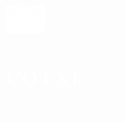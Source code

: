 \documentclass[../main.tex]{subfiles}
\begin{document}
\hspace*{0.2cm}
    \begin{minipage}[t]{2cm}
        \vspace*{0.9cm}\includegraphics[width=1.5cm]{assets/car.png}
    \end{minipage}
    \begin{minipage}[t]{5cm}
    
        \vspace*{0.75cm}
        \section*{\textcolor{white}{COTXE}}
        \vspace*{-0.25cm}
        \textcolor{white}{
            Carnet de conduir B [2019]
        }
    \end{minipage}
\end{document}
